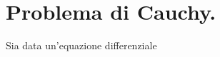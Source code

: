 \section{Problema di Cauchy.}
\label{SistemiDinamici_ProblemaDiCauchy}
\begin{Definition}
	Sia data un'equazione differenziale
\end{Definition}
